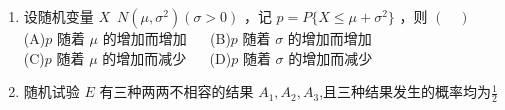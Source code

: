 \begin{enumerate}
\item 设随机变量 $X$~$N(\mu,\sigma^2)(\sigma>0)$  ，记  $p=P\{X \le \mu +\sigma ^2\}$ ，则 $(\quad)$\\
(A)$p$ 随着 $\mu$ 的增加而增加  $\quad$
(B)$p$ 随着 $\sigma$ 的增加而增加\\
(C)$p$ 随着 $\mu$ 的增加而减少 $\quad$
(D)$p$ 随着 $\sigma$ 的增加而减少
\item 随机试验 $E$ 有三种两两不相容的结果 $A_1,A_2,A_3$,且三种结果发生的概率均为$\frac1 2$

\end{enumerate}
